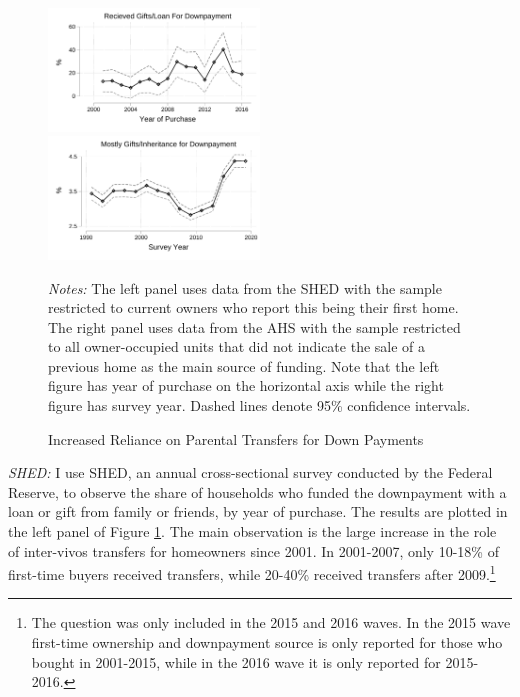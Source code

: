 \documentclass[12pt]{article}
\begin{document}
\begin{figure}
	\caption{Increased Reliance on Parental Transfers for Down Payments}\label{fig:motivation}
	\includegraphics[width=0.5\textwidth]{../tabfig/descr/SHED_gift_scatter_SE_paper}%
	\includegraphics[width=0.5\textwidth]{../tabfig/descr/AHS_majorsourcedown_surveyyear_paper}%
	
	 {\begin{footnotesize} \textit{Notes:} The left panel uses data from the SHED with the sample restricted to current owners who report this being their first home. The right panel uses data from the AHS with the sample restricted to all owner-occupied units that did not indicate the sale of a previous home as the main source of funding. Note that the left figure has year of purchase on the horizontal axis while the right figure has survey year. Dashed lines denote 95\% confidence intervals.\end{footnotesize}}
\end{figure}

\textit{SHED:} I use SHED, an annual cross-sectional survey conducted by the Federal Reserve,  to observe the share of households who funded the downpayment with a loan or gift from family or friends, by year of purchase. The results are plotted in the left panel of Figure \ref{fig:motivation}. The main observation is the large increase in the role of inter-vivos transfers for homeowners since 2001. In 2001-2007, only 10-18\% of first-time buyers received transfers, while 20-40\% received transfers after 2009.\footnote{The question was only included in the 2015 and 2016 waves. In the 2015 wave first-time ownership and downpayment source is only reported for those who bought in 2001-2015, while in the 2016 wave it is only reported for 2015-2016. } 
\end{document}
